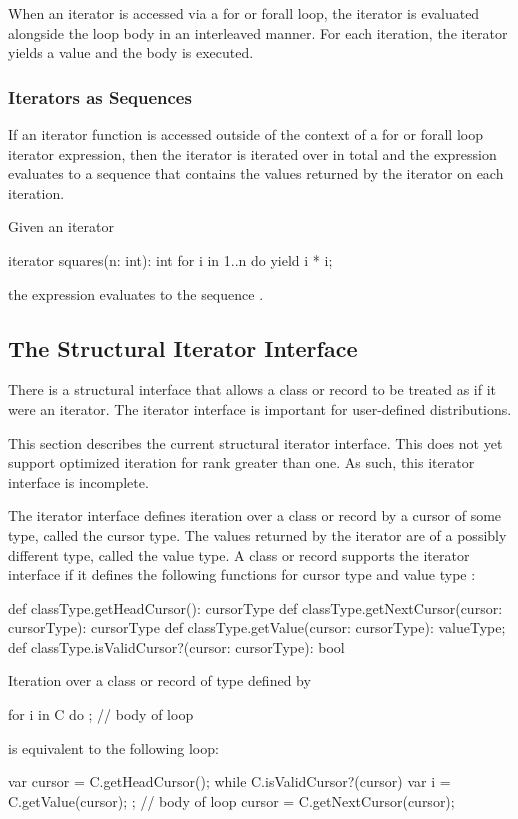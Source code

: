 When an iterator is accessed via a for or forall loop, the iterator is
evaluated alongside the loop body in an interleaved manner.  For each
iteration, the iterator yields a value and the body is executed.

\subsubsection{Iterators as Sequences}
\label{Iterators_as_Sequences}

If an iterator function is accessed outside of the context of a for or
forall loop iterator expression, then the iterator is iterated over in
total and the expression evaluates to a sequence that contains the
values returned by the iterator on each iteration.
\begin{example}
Given an iterator
\begin{chapel}
iterator squares(n: int): int {
  for i in 1..n do
    yield i * i;
}
\end{chapel}
the expression  evaluates to the sequence .
\end{example}

\subsection{The Structural Iterator Interface}
\label{Iterator_Interface}

There is a structural interface that allows a class or record to be
treated as if it were an iterator.  The iterator interface is
important for user-defined distributions.

\begin{implementation}
This section describes the current structural iterator interface.
This does not yet support optimized iteration for rank greater than
one.  As such, this iterator interface is incomplete.
\end{implementation}

The iterator interface defines iteration over a class or record by a
cursor of some type, called the cursor type.  The values returned by
the iterator are of a possibly different type, called the value type.
A class or record  supports the iterator interface if
it defines the following functions for cursor type 
and value type :
\begin{chapel}
def classType.getHeadCursor(): cursorType
def classType.getNextCursor(cursor: cursorType): cursorType
def classType.getValue(cursor: cursorType): valueType;
def classType.isValidCursor?(cursor: cursorType): bool
\end{chapel}

Iteration over a class or record  of type 
defined by
\begin{chapel}
for i in C do
  ; // body of loop
\end{chapel}
is equivalent to the following loop:
\begin{chapel}
var cursor = C.getHeadCursor();
while C.isValidCursor?(cursor) {
  var i = C.getValue(cursor);
  ; // body of loop
  cursor = C.getNextCursor(cursor);
}
\end{chapel}
